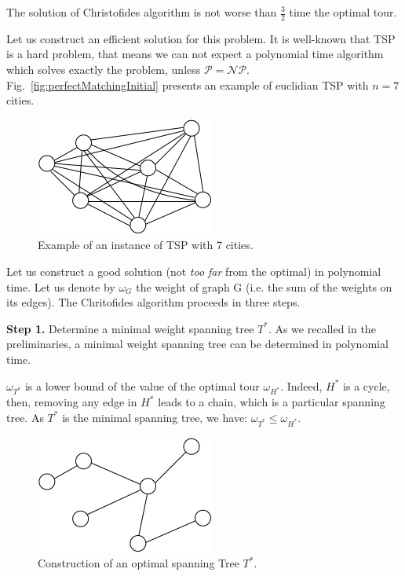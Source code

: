 The solution of Christofides algorithm is not worse than $\frac{3}{2}$ time the optimal tour.
\bigskip

Let us construct an efficient solution for this problem. It is well-known that TSP is a hard problem, 
that means we can not expect a polynomial time algorithm which solves exactly the problem, unless $\mathcal{P} = \mathcal{NP}$. 
Fig.~\ref{fig:perfectMatchingInitial} presents an example of euclidian TSP with $n=7$ cities. 
\begin{figure}[h]
\begin{center}
       \includegraphics[scale=0.8]{FiguresGraph/christofides1}
       \caption{Example of an instance of TSP with 7 cities.}
              \label{fig:christofidesInitial}
\end{center}
\end{figure}

Let us construct a good solution (not \textit{too far} from the optimal) in polynomial time. 
Let us denote by $\omega_G$ the weight of graph G (i.e. the sum of the weights on its edges). 
The Chritofides algorithm proceeds in three steps. 
\bigskip

\textbf{Step 1.} Determine a minimal weight spanning tree $T^*$. 
As we recalled in the preliminaries, a minimal weight spanning tree can be determined in polynomial time. 
\bigskip

$\omega_{T^*}$ is a lower bound of the value of the optimal tour $\omega_{H^*}$. 
Indeed, $H^*$ is a cycle, then, removing any edge in $H^*$ leads to a chain, which is a particular spanning tree.
As $T^*$ is the minimal spanning tree, we have:
$\omega_{T^*} \leq \omega_{H^*}$.

\begin{figure}[h]
\begin{center}
       \includegraphics[scale=0.6]{FiguresGraph/christofides2}
       \caption{Construction of an optimal spanning Tree $T^*$.}
              \label{fig:christofidesSpanningTree}
\end{center}
\end{figure}


